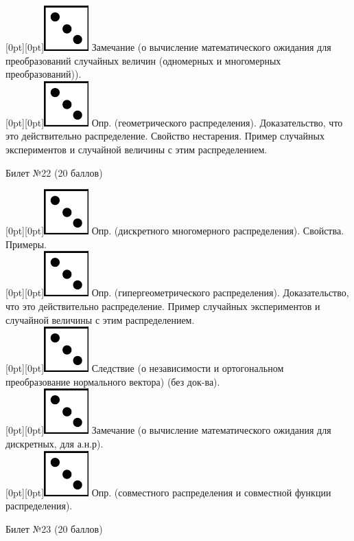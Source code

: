 \documentclass[10pt]{article}
\begin{document}
\raisebox{-1pt}[0pt][0pt]{\includegraphics[width=0.02\linewidth]{3.png}} Замечание (о вычисление  математического ожидания для преобразований случайных величин (одномерных и многомерных преобразований)). \\
\raisebox{-1pt}[0pt][0pt]{\includegraphics[width=0.02\linewidth]{3.png}}  Опр. (геометрического распределения). Доказательство, что это действительно распределение. Свойство нестарения. Пример случайных экспериментов и случайной величины с этим распределением. \\      
\begin{center} {\Large Билет №22 (20 баллов)} \end{center}
\raisebox{-1pt}[0pt][0pt]{\includegraphics[width=0.02\linewidth]{3.png}} Опр. (дискретного многомерного распределения). Свойства. Примеры. \\
\raisebox{-1pt}[0pt][0pt]{\includegraphics[width=0.02\linewidth]{3.png}} Опр. (гипергеометрического распределения). Доказательство, что это действительно распределение. Пример случайных экспериментов и случайной величины с этим распределением. \\      
\raisebox{-1pt}[0pt][0pt]{\includegraphics[width=0.02\linewidth]{3.png}} Следствие (о независимости и  ортогональном преобразование нормального вектора) (без док-ва). \\ 
\raisebox{-1pt}[0pt][0pt]{\includegraphics[width=0.02\linewidth]{3.png}} Замечание (о вычисление  математического ожидания для дискретных, для а.н.р). \\
\raisebox{-1pt}[0pt][0pt]{\includegraphics[width=0.02\linewidth]{3.png}} Опр. (совместного распределения и  совместной функции распределения). \\
\begin{center} {\Large Билет №23 (20 баллов)} \end{center}
\end{document}
